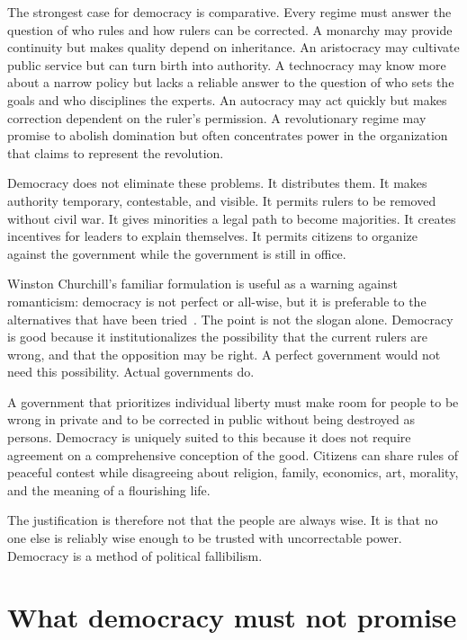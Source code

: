 ﻿\documentclass[12pt,a4paper]{book}
\begin{document}
The strongest case for democracy is comparative.  Every regime must answer
the question of who rules and how rulers can be corrected.  A monarchy may
provide continuity but makes quality depend on inheritance.  An aristocracy
may cultivate public service but can turn birth into authority.  A
technocracy may know more about a narrow policy but lacks a reliable answer
to the question of who sets the goals and who disciplines the experts.  An
autocracy may act quickly but makes correction dependent on the ruler's
permission.  A revolutionary regime may promise to abolish domination but
often concentrates power in the organization that claims to represent the
revolution.

Democracy does not eliminate these problems.  It distributes them.  It makes
authority temporary, contestable, and visible.  It permits rulers to be
removed without civil war.  It gives minorities a legal path to become
majorities.  It creates incentives for leaders to explain themselves.  It
permits citizens to organize against the government while the government is
still in office.

Winston Churchill's familiar formulation is useful as a warning against
romanticism: democracy is not perfect or all-wise, but it is preferable to
the alternatives that have been tried~\cite{churchill-democracy}.  The point
is not the slogan alone.  Democracy is good because it institutionalizes the
possibility that the current rulers are wrong, and that the opposition may
be right.  A perfect government would not need this possibility.  Actual
governments do.

A government that prioritizes individual liberty must make room for people
to be wrong in private and to be corrected in public without being destroyed
as persons.  Democracy is uniquely suited to this because it does not
require agreement on a comprehensive conception of the good.  Citizens can
share rules of peaceful contest while disagreeing about religion, family,
economics, art, morality, and the meaning of a flourishing life.

The justification is therefore not that the people are always wise.  It is
that no one else is reliably wise enough to be trusted with uncorrectable
power.  Democracy is a method of political fallibilism.

\section{What democracy must not promise}
\end{document}
